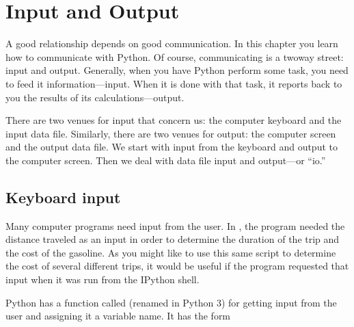 \documentclass[letterpaper,10pt,english]{sphinxmanual}
\begin{document}
\chapter{Input and Output}
\label{\detokenize{chap4/chap4_io:input-and-output}}\label{\detokenize{chap4/chap4_io:chap4}}\label{\detokenize{chap4/chap4_io::doc}}
\ignorespaces 
\sphinxAtStartPar
A good relationship depends on good communication.  In this chapter you learn how to communicate with Python.  Of course, communicating is a two\sphinxhyphen{}way street: input and output.  Generally, when you have Python perform some task, you need to feed it information—input.  When it is done with that task, it reports back to you the results of its calculations—output.

\sphinxAtStartPar
There are two venues for input that concern us: the computer keyboard and the input data file.  Similarly, there are two venues for output: the computer screen and the output data file.  We start with input from the keyboard and output to the computer screen.  Then we deal with data file input and output—or “io.”

\ignorespaces 

\section{Keyboard input}
\label{\detokenize{chap4/chap4_io:keyboard-input}}\label{\detokenize{chap4/chap4_io:index-1}}
\sphinxAtStartPar
Many computer programs need input from the user.  In {\hyperref[\detokenize{chap2/chap2_basics:chap2-scriptexmp1}]{}}, the program needed the distance traveled as an input in order to determine the duration of the trip and the cost of the gasoline.  As you might like to use this same script to determine the cost of several different trips, it would be useful if the program requested that input when it was run from the IPython shell.

\sphinxAtStartPar
Python has a function called  (renamed  in Python 3) for getting input from the user and assigning it a variable name.  It has the form

\begin{sphinxVerbatim}[commandchars=\\\{\}]
  
\end{sphinxVerbatim}
\end{document}
